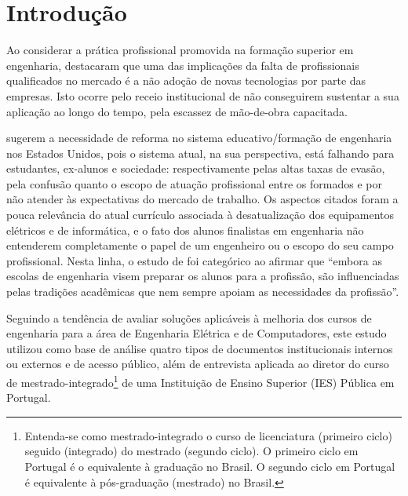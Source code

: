 \documentclass{textolivre-html}
\begin{document}
\begin{polyabstract}
\begin{english}
\begin{abstract}
\end{abstract}
\end{english}

\end{polyabstract}


\section{Introdução}\label{sec-intro}
Ao considerar a prática profissional promovida na formação superior em engenharia, \textcite{nager2016} destacaram que uma das implicações da falta de profissionais qualificados no mercado é a não adoção de novas tecnologias por parte das empresas. Isto ocorre pelo receio institucional de não conseguirem sustentar a sua aplicação ao longo do tempo, pela escassez de mão-de-obra capacitada.

\textcite{maciejewski2017} sugerem a necessidade de reforma no sistema educativo/formação de engenharia nos Estados Unidos, pois o sistema atual, na sua perspectiva, está falhando para estudantes, ex-alunos e sociedade: respectivamente pelas altas taxas de evasão, pela confusão quanto o escopo de atuação profissional entre os formados e por não atender às expectativas do mercado de trabalho. Os aspectos citados foram a pouca relevância do atual currículo associada à desatualização dos equipamentos elétricos e de informática, e o fato dos alunos finalistas em engenharia não entenderem completamente o papel de um engenheiro ou o escopo do seu campo profissional. Nesta linha, o estudo de \textcite[p. 4]{sheppard2008} foi categórico ao afirmar que “embora as escolas de engenharia visem preparar os alunos para a profissão, são influenciadas pelas tradições acadêmicas que nem sempre apoiam as necessidades da profissão”.

Seguindo a tendência de avaliar soluções aplicáveis à melhoria dos cursos de engenharia para a área de Engenharia Elétrica e de Computadores, este estudo utilizou como base de análise quatro tipos de documentos institucionais internos ou externos e de acesso público, além de entrevista aplicada ao diretor do curso de mestrado-integrado\footnote{Entenda-se como mestrado-integrado o curso de licenciatura (primeiro ciclo) seguido (integrado) do mestrado (segundo ciclo). O primeiro ciclo em Portugal é o equivalente à graduação no Brasil. O segundo ciclo em Portugal é equivalente à pós-graduação (mestrado) no Brasil.} de uma Instituição de Ensino Superior (IES) Pública em Portugal.
\end{document}
